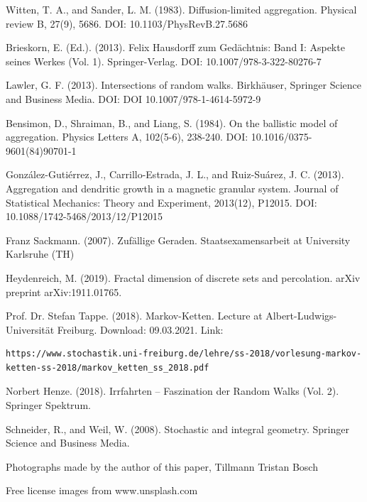 \documentclass[12pt,a4paper]{scrartcl}
\newcommand{\1}{\mathbbm{1}}
\theoremstyle{definition}
\numberwithin{equation}{section}
\begin{document}
\begingroup
\renewcommand{\section}[2]{}%

\begin{thebibliography}{biblio}
\thispagestyle{empty}

Witten, T. A., and Sander, L. M. (1983). Diffusion-limited aggregation. Physical review B, 27(9), 5686. DOI: 10.1103/PhysRevB.27.5686

Brieskorn, E. (Ed.). (2013). Felix Hausdorff zum Gedächtnis: Band I: Aspekte seines Werkes (Vol. 1). Springer-Verlag. DOI: 10.1007/978-3-322-80276-7

Lawler, G. F. (2013). Intersections of random walks. Birkhäuser, Springer Science and Business Media. DOI: DOI 10.1007/978-1-4614-5972-9

Bensimon, D., Shraiman, B., and Liang, S. (1984). On the ballistic model of aggregation. Physics Letters A, 102(5-6), 238-240. DOI: 10.1016/0375-9601(84)90701-1

González-Gutiérrez, J., Carrillo-Estrada, J. L., and Ruiz-Suárez, J. C. (2013). Aggregation and dendritic growth in a magnetic granular system. Journal of Statistical Mechanics: Theory and Experiment, 2013(12), P12015. DOI: 10.1088/1742-5468/2013/12/P12015

Franz Sackmann. (2007). Zufällige Geraden. Staatsexamensarbeit at University Karlsruhe (TH)

Heydenreich, M. (2019). Fractal dimension of discrete sets and percolation. arXiv preprint arXiv:1911.01765.

Prof. Dr. Stefan Tappe. (2018). Markov-Ketten. Lecture at Albert-Ludwigs-Universität Freiburg. Download: 09.03.2021. Link: 
\begin{Verbatim}[fontsize=\tiny]
https://www.stochastik.uni-freiburg.de/lehre/ss-2018/vorlesung-markov-ketten-ss-2018/markov_ketten_ss_2018.pdf
\end{Verbatim}

Norbert Henze. (2018). Irrfahrten – Faszination der Random Walks (Vol. 2). Springer Spektrum. 

Schneider, R., and Weil, W. (2008). Stochastic and integral geometry. Springer Science and Business Media.

Photographs made by the author of this paper, Tillmann Tristan Bosch

Free license images from www.unsplash.com

\end{thebibliography}
\endgroup
\end{document}
